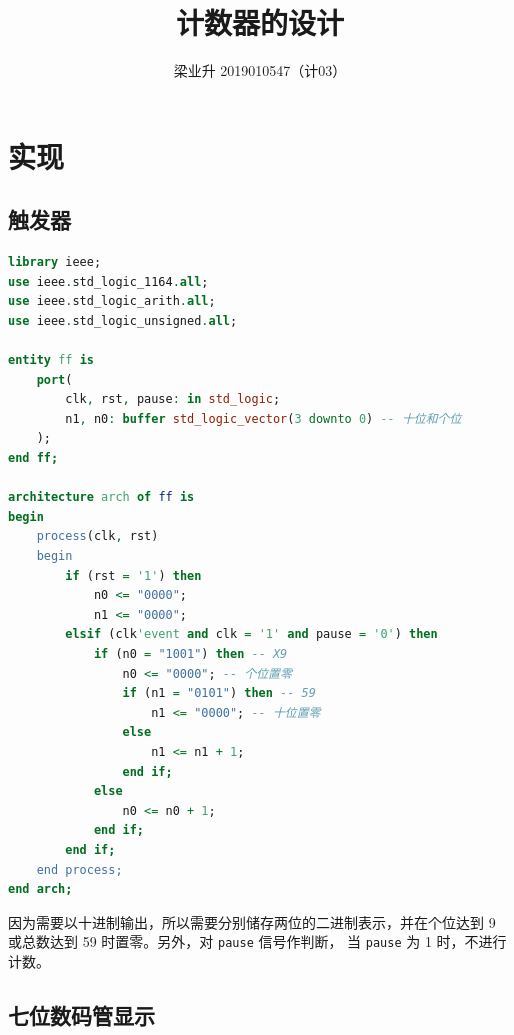 \documentclass[a4paper]{article}
\begin{document}
\title{计数器的设计}
\author{梁业升 2019010547（计03）}

\maketitle




\section{实现}
\subsection{触发器}

\begin{lstlisting}[language=vhdl]
library ieee;
use ieee.std_logic_1164.all;
use ieee.std_logic_arith.all;
use ieee.std_logic_unsigned.all;

entity ff is
    port(
        clk, rst, pause: in std_logic;
        n1, n0: buffer std_logic_vector(3 downto 0) -- 十位和个位
    );
end ff;

architecture arch of ff is
begin
    process(clk, rst)
    begin
        if (rst = '1') then
            n0 <= "0000";
            n1 <= "0000";
        elsif (clk'event and clk = '1' and pause = '0') then
            if (n0 = "1001") then -- X9
                n0 <= "0000"; -- 个位置零
                if (n1 = "0101") then -- 59
                    n1 <= "0000"; -- 十位置零
                else
                    n1 <= n1 + 1;
                end if;
            else
                n0 <= n0 + 1;
            end if;
        end if;
    end process;
end arch;
\end{lstlisting}

因为需要以十进制输出，所以需要分别储存两位的二进制表示，并在个位达到 9 或总数达到 59 时置零。另外，对 \texttt{pause} 信号作判断，
当 \texttt{pause} 为 1 时，不进行计数。

\subsection{七位数码管显示}
\end{document}
